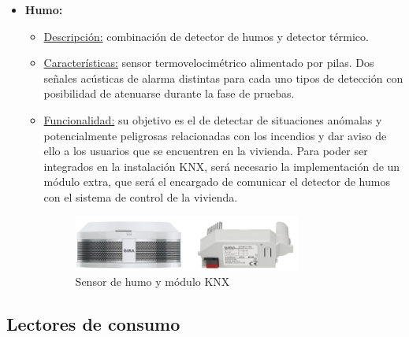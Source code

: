 \begin{itemize}
\item \textbf{Humo:} 
	\begin{itemize}
	\item\underline{Descripción:} combinación de detector de humos y detector térmico.
	\item \underline{Características:} sensor termovelocimétrico alimentado por pilas. Dos señales acústicas de alarma distintas para cada uno tipos de detección con posibilidad de atenuarse durante la fase de pruebas.
	\item \underline{Funcionalidad:} su objetivo es el de detectar de situaciones anómalas y potencialmente peligrosas relacionadas con los incendios y dar aviso de ello a los usuarios que se encuentren en la vivienda. Para poder ser integrados en la instalación KNX, será necesario la implementación de un módulo extra, que será el encargado de comunicar el detector de humos con el sistema de control de la vivienda.
	\begin{figure}[h]
	\centering
	\includegraphics[width=0.75\textwidth]{figures/sensor_humo.png}   
	\caption{Sensor de humo y módulo KNX}
	\label{fig:sensor_humo}
	\end{figure}
	\end{itemize} 
\end{itemize} 

\subsection{Lectores de consumo}

